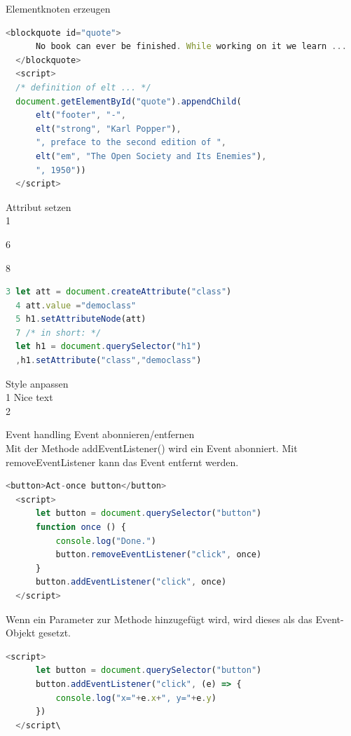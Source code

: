   Elementknoten erzeugen
  
  \begin{lstlisting}[language=JavaScript, style=basesmol]
  <blockquote id="quote">
      No book can ever be finished. While working on it we learn ...
  </blockquote>
  <script>
  /* definition of elt ... */
  document.getElementById("quote").appendChild(
      elt("footer", "-",
      elt("strong", "Karl Popper"),
      ", preface to the second edition of ",
      elt("em", "The Open Society and Its Enemies"),
      ", 1950"))
  </script>
  \end{lstlisting}
  
  Attribut setzen\\
  1
  
  6
  
  8
  
  \begin{lstlisting}[language=JavaScript, style=basesmol]
  3 let att = document.createAttribute("class")
  4 att.value ="democlass"
  5 h1.setAttributeNode(att)
  7 /* in short: */
  let h1 = document.querySelector("h1")
  ,h1.setAttribute("class","democlass")
  \end{lstlisting}
  
  Style anpassen\\
  1 Nice text\\
  2 
  
  \begin{definition}{Event handling}
  Event abonnieren/entfernen\\
  Mit der Methode addEventListener() wird ein Event abonniert. Mit removeEventListener kann das Event entfernt werden.
  
  \begin{lstlisting}[language=JavaScript, style=basesmol]
  <button>Act-once button</button>
  <script>
      let button = document.querySelector("button")
      function once () {
          console.log("Done.")
          button.removeEventListener("click", once)
      }
      button.addEventListener("click", once)
  </script>
  \end{lstlisting}
\end{definition}
  
  Wenn ein Parameter zur Methode hinzugefügt wird, wird dieses als das Event-Objekt gesetzt.
  
  \begin{lstlisting}[language=JavaScript, style=basesmol]
  <script>
      let button = document.querySelector("button")
      button.addEventListener("click", (e) => {
          console.log("x="+e.x+", y="+e.y)
      })
  </script\
  \end{lstlisting}
  
